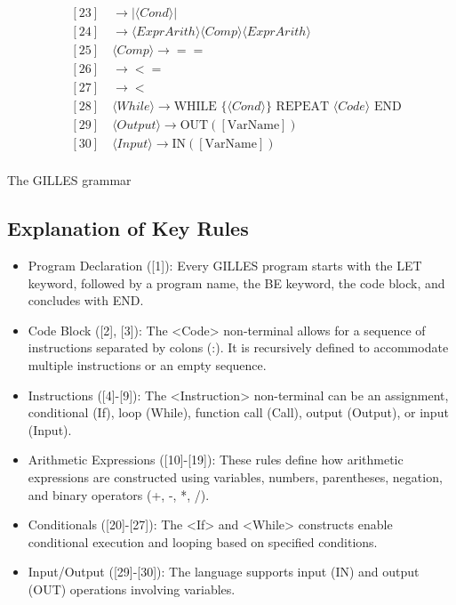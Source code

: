 \begin{footnotesize}
\begin{align*}
		&[23] \quad \rightarrow | \langle Cond \rangle | \\
		&[24] \quad \rightarrow \langle ExprArith \rangle \langle Comp \rangle \langle ExprArith \rangle \\
		&[25] \quad \langle Comp \rangle \rightarrow == \\
		&[26] \quad \rightarrow <= \\
		&[27] \quad \rightarrow < \\
		&[28] \quad \langle While \rangle \rightarrow \text{WHILE } \{ \langle Cond \rangle \} \text{ REPEAT } \langle Code \rangle \text{ END} \\
		&[29] \quad \langle Output \rangle \rightarrow \text{OUT}([\text{VarName}]) \\
		&[30] \quad \langle Input \rangle \rightarrow \text{IN}([\text{VarName}]) \\
	\end{align*}
\end{footnotesize}

	\begin{table}[h]
		\centering
		\caption{The GILLES grammar}
	\end{table}

 \subsection{Explanation of Key Rules}

	\begin{itemize}
	\item Program Declaration ([1]): Every GILLES program starts with the LET keyword, followed by a program name, the BE keyword, the code block, and concludes with END.
	\item Code Block ([2], [3]): The <Code> non-terminal allows for a sequence of instructions separated by colons (:). It is recursively defined to accommodate multiple instructions or an empty sequence.
	\item Instructions ([4]-[9]): The <Instruction> non-terminal can be an assignment, conditional (If), loop (While), function call (Call), output (Output), or input (Input).
	\item Arithmetic Expressions ([10]-[19]): These rules define how arithmetic expressions are constructed using variables, numbers, parentheses, negation, and binary operators (+, -, *, /).
	\item Conditionals ([20]-[27]): The <If> and <While> constructs enable conditional execution and looping based on specified conditions.
	\item Input/Output ([29]-[30]): The language supports input (IN) and output (OUT) operations involving variables.
	\end{itemize}

